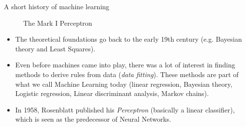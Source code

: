 \documentclass[xcolor=pdftex,dvipsnames,table]{beamer}
\begin{document}
\begin{frame}{A short history of machine learning}
\begin{figure}[htb]
  \centering
  \hspace{2cm}
  \caption{The Mark I Perceptron}
\end{figure}
\vspace{-.5cm}
\begin{itemize}
	\item The theoretical foundations go back to the early 19th century (e.g. Bayesian theory and Least Squares). 
	\item Even before machines came into play, there was a lot of interest in finding methods to derive rules from data (\emph{data fitting}). These methods are part of what we call Machine Learning today (linear regression, Bayesian theory, Logistic regression, Linear discriminant analysis, Markov chains). 
	\item In 1958, Rosenblatt published his \emph{Perceptron} (basically a linear classifier), which is seen as the predecessor of Neural Networks.
\end{itemize}
\end{frame}
\end{document}
